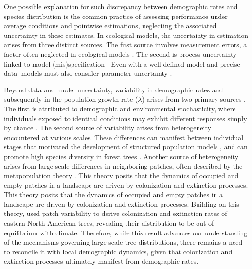 One possible explanation for such discrepancy between demographic rates
and species distribution is the common practice of assessing performance
under average conditions and pointwise estimations, neglecting the
associated uncertainty in these estimates. In ecological models, the
uncertainty in estimation arises from three distinct sources. The first
source involves measurement errors, a factor often neglected in
ecological models \citep{Damgaard2020}. The second is process
uncertainty linked to model (mis)specification \citep{Harwood2003}. Even
with a well-defined model and precise data, models must also consider
parameter uncertainty \citep{Cressie2009, Shoemaker2020}.

Beyond data and model uncertainty, variability in demographic rates and
subsequently in the population growth rate (\(\lambda\)) arises from two
primary sources \citep{van2020}. The first is attributed to demographic
and environmental stochasticity, where individuals exposed to identical
conditions may exhibit different responses simply by chance
\citep{Caswell2009}. The second source of variability arises from
heterogeneity encountered at various scales. These differences can
manifest between individual stages that motivated the development of
structured population models \citep{Lewis1942, leslie1945}, and can
promote high species diversity in forest trees \citep{Clark2010}.
Another source of heterogeneity arises from large-scale differences in
neighboring patches, often described by the metapopulation theory
\citep{Levins1969}. This theory posits that the dynamics of occupied and
empty patches in a landscape are driven by colonization and extinction
processes. This theory posits that the dynamics of occupied and empty
patches in a landscape are driven by colonization and extinction
processes. Building on this theory, \citet{Talluto2017} used patch
variability to derive colonization and extinction rates of eastern North
American trees, revealing their distribution to be out of equilibrium
with climate. Therefore, while this result advances our understanding of
the mechanisms governing large-scale tree distributions, there remains a
need to reconcile it with local demographic dynamics, given that
colonization and extinction processes ultimately manifest from
demographic rates.

